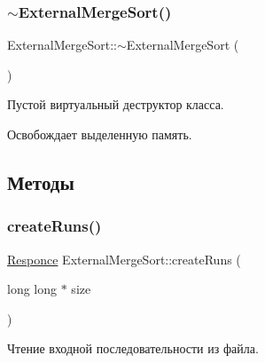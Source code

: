 \subsubsection{\texorpdfstring{$\sim$\+External\+Merge\+Sort()}{~ExternalMergeSort()}}
{\footnotesize\ttfamily External\+Merge\+Sort\+::$\sim$\+External\+Merge\+Sort (\begin{DoxyParamCaption}{ }\end{DoxyParamCaption})\hspace{0.3cm}{\ttfamily [virtual]}}



Пустой виртуальный деструктор класса. 

Освобождает выделенную память. 

\subsection{Методы}
\hypertarget{class_external_merge_sort_aa3ec5ccebe04f02538ee42d0ffe7b75c}{}\label{class_external_merge_sort_aa3ec5ccebe04f02538ee42d0ffe7b75c} 
\subsubsection{\texorpdfstring{create\+Runs()}{createRuns()}}
{\footnotesize\ttfamily \hyperlink{_structures_8h_a9864d6ef28dd6e38416afac4426b3491}{Responce} External\+Merge\+Sort\+::create\+Runs (\begin{DoxyParamCaption}\item[{long long $\ast$}]{size }\end{DoxyParamCaption})\hspace{0.3cm}{\ttfamily [private]}}



Чтение входной последовательности из файла. 



